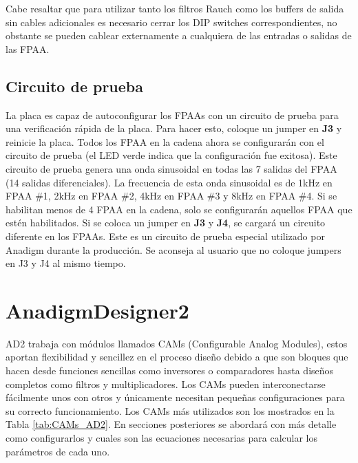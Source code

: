 	Cabe resaltar que para utilizar tanto los filtros Rauch como los buffers de salida sin cables adicionales es necesario cerrar los DIP switches correspondientes, no obstante se pueden cablear externamente a cualquiera de las entradas o salidas de las FPAA.
	
	\subsection{Circuito de prueba}

La placa es capaz de autoconfigurar los FPAAs con un circuito de prueba para una verificación rápida de la placa. Para hacer esto, coloque un jumper en \textbf{J3} y reinicie la placa. Todos los FPAA en la cadena ahora se configurarán con el circuito de prueba (el LED verde indica que la configuración fue exitosa). Este circuito de prueba genera una onda sinusoidal en todas las 7 salidas del FPAA (14 salidas diferenciales). La frecuencia de esta onda sinusoidal es de 1kHz en FPAA \#{}1, 2kHz en FPAA \#{}2, 4kHz en FPAA \#{}3 y 8kHz en FPAA \#{}4. Si se habilitan menos de 4 FPAA en la cadena, solo se configurarán aquellos FPAA que estén habilitados. Si se coloca un jumper en \textbf{J3} y \textbf{J4}, se cargará un circuito diferente en los FPAAs. Este es un circuito de prueba especial utilizado por Anadigm durante la producción. Se aconseja al usuario que no coloque jumpers en J3 y J4 al mismo tiempo.

	\section{AnadigmDesigner2}
	
	AD2 trabaja con módulos llamados CAMs (Configurable Analog Modules), estos aportan flexibilidad y sencillez en el proceso diseño debido a que son bloques que hacen desde funciones sencillas como inversores o comparadores hasta diseños completos como filtros y multiplicadores. Los CAMs pueden interconectarse fácilmente unos con otros y únicamente necesitan pequeñas configuraciones para su correcto funcionamiento. Los CAMs más utilizados son los mostrados en la Tabla \ref{tab:CAMs_AD2}. En secciones posteriores se abordará con más detalle como configurarlos y cuales son las ecuaciones necesarias para calcular los parámetros de cada uno.  
	

